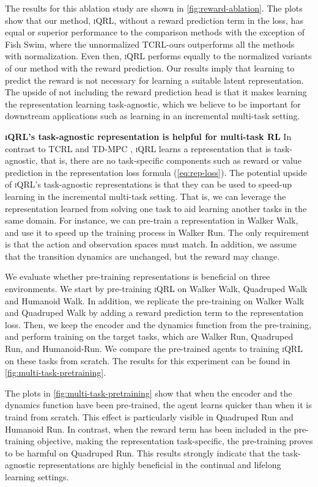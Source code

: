 \documentclass{article}
\theoremstyle{plain}
\theoremstyle{definition}
\theoremstyle{remark}
\newcommand{\our}{\textsc{iQRL}\xspace}
\begin{document}
The results for this ablation study are shown in \cref{fig:reward-ablation}. 
The plots show that our method, \our, without a reward prediction term in the loss, has equal or superior performance to the comparison methods with the exception of Fish Swim, where the unnormalized TCRL-ours outperforms all the methods with normalization. Even then, \our performs equally to the normalized variants of our method with the reward prediction. Our results imply that learning to predict the reward is not necessary for learning a suitable latent representation. The upside of not including the reward prediction head is that it makes learning the representation learning task-agnostic, which we believe to be   important for downstream applications such as learning in an incremental multi-task setting.

\textbf{\our's task-agnostic representation is helpful for multi-task RL}
In contrast to TCRL \cite{zhaoSimplifiedTemporalConsistency2023} and TD-MPC \cite{hansenTemporalDifferenceLearning2022}, \our learns a representation that is task-agnostic, that is, there are no task-specific components such as reward or value prediction in the representation loss formula (\cref{eq:rep-loss}). The potential upside of \our's task-agnostic representations is that they can be used to speed-up learning in the incremental multi-task setting. That is, we can leverage the representation learned from solving one task to aid learning another tasks in the same domain. For instance, we can pre-train a representation in Walker Walk, and use it to speed up the training process in Walker Run. The only requirement is that the action and observation spaces must match. In addition, we assume that the transition dynamics are unchanged, but the reward may change.

We evaluate whether pre-training representations is beneficial on three environments. We start by pre-training \our on Walker Walk, Quadruped Walk and Humanoid Walk. In addition, we replicate the pre-training on Walker Walk and Quadruped Walk by adding a reward prediction term to the representation loss. Then, we keep the encoder and the dynamics function from the pre-training, and perform training on the target tasks, which are Walker Run, Quadruped Run, and Humanoid-Run. We compare the pre-trained agents to training \our on these tasks from scratch. The results for this experiment can be found in \cref{fig:multi-task-pretraining}.

The plots in \cref{fig:multi-task-pretraining} show that when the encoder and the dynamics function have been pre-trained, the agent learns quicker than when it is traind from scratch. This effect is particularly visible in Quadruped Run and Humanoid Run. In contrast, when the reward term has been included in the pre-training objective, making the representation task-specific, the pre-training proves to be harmful on Quadruped Run. This results strongly indicate that the task-agnostic representations are highly beneficial in the continual and lifelong learning settings.
\end{document}
